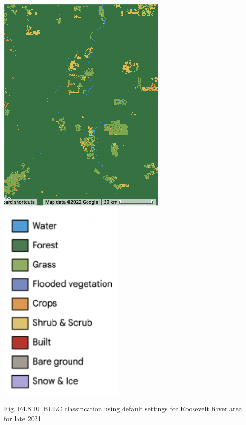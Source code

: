 \documentclass[
  letterpaper,
  DIV=11,
  numbers=noendperiod]{scrreprt}
\begin{document}
\includegraphics{./F4/image37.png}\includegraphics{./F4/image41.png}

Fig. F4.8.10~BULC classification using default settings for Roosevelt
River area for late 2021
\end{document}
